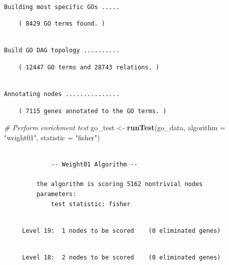 \documentclass[]{article}
\newenvironment{Shaded}{\begin{snugshade}}{\end{snugshade}}
\newcommand{\KeywordTok}[1]{\textcolor[rgb]{0.13,0.29,0.53}{\textbf{#1}}}
\newcommand{\DataTypeTok}[1]{\textcolor[rgb]{0.13,0.29,0.53}{#1}}
\newcommand{\StringTok}[1]{\textcolor[rgb]{0.31,0.60,0.02}{#1}}
\newcommand{\CommentTok}[1]{\textcolor[rgb]{0.56,0.35,0.01}{\textit{#1}}}
\newcommand{\NormalTok}[1]{#1}
\begin{document}
\begin{verbatim}

Building most specific GOs .....
\end{verbatim}

\begin{verbatim}
    ( 8429 GO terms found. )
\end{verbatim}

\begin{verbatim}

Build GO DAG topology ..........
\end{verbatim}

\begin{verbatim}
    ( 12447 GO terms and 28743 relations. )
\end{verbatim}

\begin{verbatim}

Annotating nodes ...............
\end{verbatim}

\begin{verbatim}
    ( 7115 genes annotated to the GO terms. )
\end{verbatim}

\begin{Shaded}
\begin{Highlighting}[]
\CommentTok{# Perform enrichment test}
\NormalTok{go_test <-}\StringTok{ }\KeywordTok{runTest}\NormalTok{(go_data, }\DataTypeTok{algorithm =} \StringTok{"weight01"}\NormalTok{, }\DataTypeTok{statistic =} \StringTok{"fisher"}\NormalTok{)}
\end{Highlighting}
\end{Shaded}

\begin{verbatim}

             -- Weight01 Algorithm -- 

         the algorithm is scoring 5162 nontrivial nodes
         parameters: 
             test statistic: fisher
\end{verbatim}

\begin{verbatim}

     Level 19:  1 nodes to be scored    (0 eliminated genes)
\end{verbatim}

\begin{verbatim}

     Level 18:  2 nodes to be scored    (0 eliminated genes)
\end{verbatim}
\end{document}
